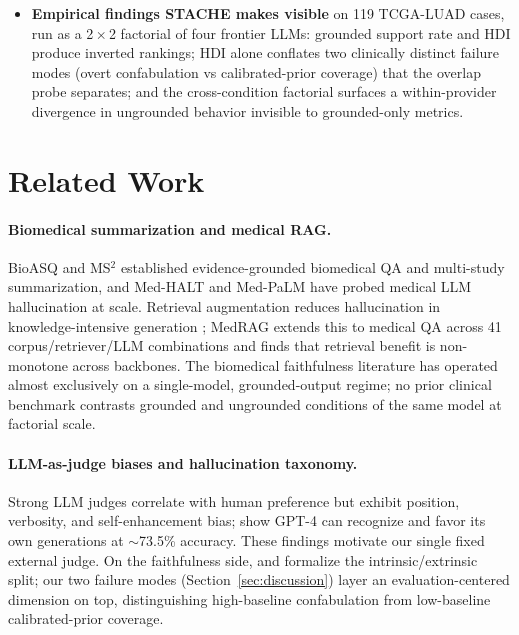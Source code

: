 \documentclass[11pt]{article}
\begin{document}
\begin{itemize}
\item \textbf{Empirical findings STACHE makes visible} on 119 TCGA-LUAD cases, run as a 2\,$\times$\,2 factorial of four frontier LLMs: grounded support rate and HDI produce inverted rankings; HDI alone conflates two clinically distinct failure modes (overt confabulation vs calibrated-prior coverage) that the overlap probe separates; and the cross-condition factorial surfaces a within-provider divergence in ungrounded behavior invisible to grounded-only metrics.
\end{itemize}

\section{Related Work}
\label{sec:related}

\paragraph{Biomedical summarization and medical RAG.}
BioASQ \citep{tsatsaronis2015bioasq} and MS$^2$ \citep{deyoung2021ms2} established evidence-grounded biomedical QA and multi-study summarization, and Med-HALT \citep{pal2023medhalt} and Med-PaLM \citep{singhal2023largelanguagemodelsencode} have probed medical LLM hallucination at scale. Retrieval augmentation reduces hallucination in knowledge-intensive generation \citep{lewis2020rag,shuster2021retrieval}; MedRAG \citep{xiong2024benchmarking} extends this to medical QA across 41 corpus/retriever/LLM combinations and finds that retrieval benefit is non-monotone across backbones. The biomedical faithfulness literature has operated almost exclusively on a single-model, grounded-output regime; no prior clinical benchmark contrasts grounded and ungrounded conditions of the same model at factorial scale.

\paragraph{LLM-as-judge biases and hallucination taxonomy.}
Strong LLM judges \citep{zheng2023judging} correlate with human preference but exhibit position, verbosity, and self-enhancement bias; \citet{panickssery2024llm} show GPT-4 can recognize and favor its own generations at $\sim$73.5\% accuracy. These findings motivate our single fixed external judge. On the faithfulness side, \citet{ji2023survey} and \citet{maynez2020faithfulness} formalize the intrinsic/extrinsic split; our two failure modes (Section~\ref{sec:discussion}) layer an evaluation-centered dimension on top, distinguishing high-baseline confabulation from low-baseline calibrated-prior coverage.
\end{document}
